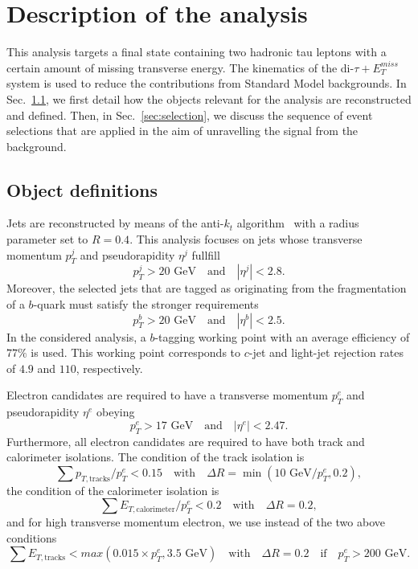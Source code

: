 \documentclass{ws-mpla}
\begin{document}
\section{Description of the analysis}\label{sec:descript}

This analysis targets a final state containing two hadronic tau leptons with a certain amount of missing transverse energy. 
The kinematics of the di-$\tau +E^{miss}_T$ system is used to reduce the contributions from Standard Model backgrounds. 
In Sec.~\ref{sec:obj}, we first detail how the objects relevant for the analysis are reconstructed and defined. Then, in Sec.~\ref{sec:selection}, we discuss the sequence of event selections that are applied in the aim of unravelling the signal from the background.

\subsection{Object definitions}\label{sec:obj}

Jets are reconstructed by means of the anti-$k_t$ algorithm~\cite{Cacciari:2008gp} with a radius parameter set to $R=0.4$. This analysis focuses on jets whose transverse momentum $p^j_T$ and pseudorapidity $\eta^j$ fullfill
\begin{equation}
p^j_T > 20 \textrm{ GeV}\quad \textrm{and}\quad |\eta^j| < 2.8.
\end{equation} 
Moreover, the selected jets that are tagged as originating from the fragmentation of a $b$-quark must satisfy the stronger requirements
\begin{equation}
p^b_T > 20 \textrm{ GeV}\quad \textrm{and}\quad |\eta^b| < 2.5.
\end{equation}
In the considered analysis, a $b$-tagging working point with an average efficiency of $77\%$ is used. This working point corresponds to $c$-jet and light-jet rejection rates of $4.9$ and $110$, respectively.

Electron candidates are required to have a transverse momentum $p^e_T$ and pseudorapidity $\eta^e$ obeying
\begin{equation}
p^e_T > 17 \textrm{ GeV}\quad \textrm{and}\quad |\eta^e| < 2.47.
\end{equation}
Furthermore, all electron candidates are required to have both track and calorimeter isolations. The condition of the track isolation is
\begin{equation}
\sum p_{T,\textrm{tracks}}/p^e_T < 0.15\quad \textrm{with}\quad \Delta R=\min(10\textrm{ GeV}/p^e_T,0.2),
\end{equation}
the condition of the calorimeter isolation is
\begin{equation}
\sum E_{T,\textrm{calorimeter}}/p^e_T < 0.2\quad \textrm{with}\quad \Delta R=0.2,
\end{equation}
and for high transverse momentum electron, we use instead of the two above conditions
\begin{equation}
\sum E_{T,\textrm{tracks}} < max(0.015\times p^e_T,3.5\textrm{ GeV})\quad \textrm{with}\quad \Delta R=0.2\quad \textrm{if}\quad p^e_T > 200\textrm{ GeV}.
\end{equation}
\end{document}
